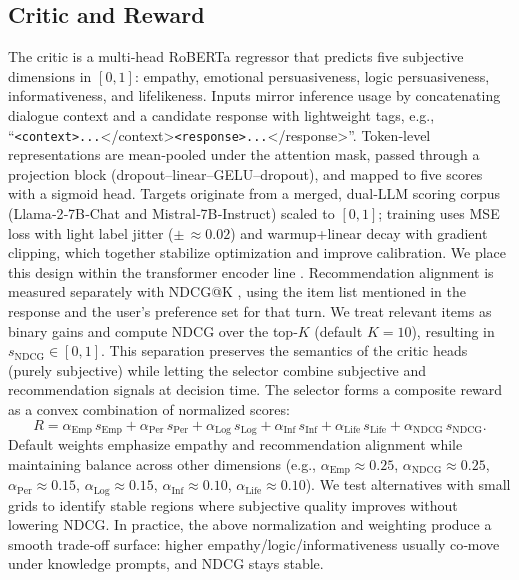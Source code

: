 \documentclass[12pt]{article}
\begin{document}
  \subsection{Critic and Reward}
  The critic is a multi‑head RoBERTa regressor \citep{liu2019roberta} that predicts five subjective dimensions in $[0,1]$: empathy, emotional persuasiveness, logic persuasiveness, informativeness, and lifelikeness. Inputs mirror inference usage by concatenating dialogue context and a candidate response with lightweight tags, e.g., ``\texttt{<context>...}</context>\texttt{<response>...}</response>''. Token‑level representations are mean‑pooled under the attention mask, passed through a projection block (dropout–linear–GELU–dropout), and mapped to five scores with a sigmoid head. Targets originate from a merged, dual‑LLM scoring corpus (Llama‑2‑7B‑Chat and Mistral‑7B‑Instruct) scaled to $[0,1]$; training uses MSE loss with light label jitter (\(\pm\,\approx0.02\)) and warmup+linear decay with gradient clipping, which together stabilize optimization and improve calibration. We place this design within the transformer encoder line \citep{devlin2018bert,vaswani2017attention}.
  \newline
  \newline
  Recommendation alignment is measured separately with NDCG@K \citep{evidently_ndcg}, using the item list mentioned in the response and the user's preference set for that turn. We treat relevant items as binary gains and compute NDCG over the top‑$K$ (default $K=10$), resulting in $s_{\mathrm{NDCG}}\in[0,1]$. This separation preserves the semantics of the critic heads (purely subjective) while letting the selector combine subjective and recommendation signals at decision time.
  \newline
  \newline
  The selector forms a composite reward as a convex combination of normalized scores:
  \[
  R = \alpha_{\mathrm{Emp}}\,s_{\mathrm{Emp}} + \alpha_{\mathrm{Per}}\,s_{\mathrm{Per}} + \alpha_{\mathrm{Log}}\,s_{\mathrm{Log}} + \alpha_{\mathrm{Inf}}\,s_{\mathrm{Inf}} + \alpha_{\mathrm{Life}}\,s_{\mathrm{Life}} + \alpha_{\mathrm{NDCG}}\,s_{\mathrm{NDCG}}.
  \]
  Default weights emphasize empathy and recommendation alignment while maintaining balance across other dimensions (e.g., $\alpha_{\mathrm{Emp}}\approx0.25$, $\alpha_{\mathrm{NDCG}}\approx0.25$, $\alpha_{\mathrm{Per}}\approx0.15$, $\alpha_{\mathrm{Log}}\approx0.15$, $\alpha_{\mathrm{Inf}}\approx0.10$, $\alpha_{\mathrm{Life}}\approx0.10$). We test alternatives with small grids to identify stable regions where subjective quality improves without lowering NDCG. In practice, the above normalization and weighting produce a smooth trade‑off surface: higher empathy/logic/informativeness usually co‑move under knowledge prompts, and NDCG stays stable.
\end{document}
